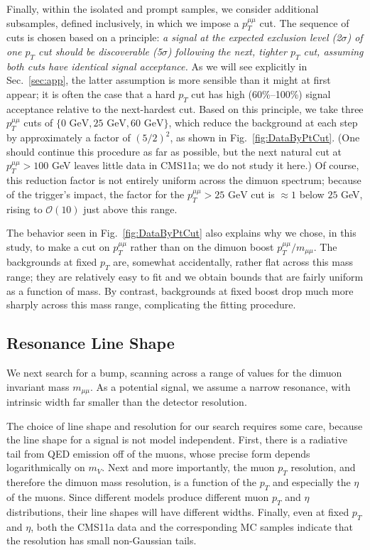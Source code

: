 \documentclass[aps,prd,twocolumn,superscriptaddress,preprintnumbers,nofootinbib,longbibliography,floatfix]{revtex4-1}
\newcommand{\ptmm}{p_T^{\mu\mu}}
\newcommand{\GeV}{\text{~GeV}}
\DeclareRobustCommand{\Sec}[1]{Sec.~\ref{#1}}
\DeclareRobustCommand{\Fig}[1]{Fig.~\ref{#1}}
\begin{document}
Finally, within the isolated and prompt samples, we consider additional subsamples, defined inclusively, in which we impose a $\ptmm$ cut.
%  
The sequence of cuts is chosen  based on a principle: {\it a signal at the expected exclusion level (2$\sigma$) of one $p_T$ cut should be discoverable (5$\sigma$) following the next, tighter $p_T$ cut, assuming both cuts have identical signal acceptance.}
%
As we will see explicitly in \Sec{sec:app}, the latter assumption is more sensible than it might at first appear; it is often the case that a hard $p_T$ cut has high %
(60\%--100\%) signal acceptance relative to the next-hardest cut.
% 
Based on this principle, we take three $\ptmm$ cuts of $\{0 \GeV, 25 \GeV, 60 \GeV\}$, which reduce the background at each step by approximately a factor of $(5/2)^2$, as shown in \Fig{fig:DataByPtCut}.
% 
(One should continue this procedure as far as possible, but the next natural cut at $\ptmm>100$ GeV leaves little data in CMS11a; we do not study it here.)  
%
Of course, this reduction factor is not entirely uniform across the dimuon spectrum; because of the trigger's impact, the factor for the $\ptmm>25 \GeV$ cut is $\approx1$ below $25$ GeV, rising to $\mathcal{O}(10)$ just above this range. 


The behavior seen in \Fig{fig:DataByPtCut} also explains why we chose, in this study, to make a cut on $\ptmm$ rather than on the dimuon boost $\ptmm/m_{\mu\mu}$.
%
The backgrounds at fixed $p_T$ are, somewhat accidentally, rather flat across this mass range; they are relatively easy to fit and we obtain bounds that are fairly uniform as a function of mass.
%
By contrast, backgrounds at fixed boost drop much more sharply across this mass range, complicating the fitting procedure.

\subsection{Resonance Line Shape}
\label{subsec:lineshape}


We next search for a bump, scanning across a range of values for the dimuon invariant mass $m_{\mu\mu}$.
%
As a potential signal, we assume a narrow resonance, with intrinsic width far smaller than the detector resolution.  


The choice of line shape and resolution for our search requires some care, because the line shape for a signal is not model independent.
%
First, there is a radiative tail from QED emission off of the muons, whose precise form depends logarithmically on $m_V$.
%
Next and more importantly, the muon $p_T$ resolution, and therefore the dimuon mass resolution, is a function of the $p_T$ and especially the $\eta$ of the muons.
%
Since different models produce different muon $p_T$ and $\eta$ distributions, their line shapes will have different widths.
%
Finally, even at fixed $p_T$ and $\eta$, both the CMS11a data and the corresponding MC samples indicate that the resolution has small non-Gaussian tails.
\end{document}
